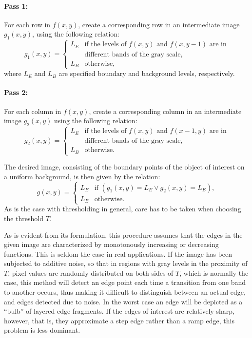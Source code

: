 \paragraph{Pass 1:} For each row in $f(x,y)$, create a corresponding
row in an intermediate image $g_{1}(x,y)$, using the following
relation: 
\begin{equation}
  g_{1}(x,y)=\left\{
    \begin{array}{ll}
      L_{E} & \mbox{if the levels of $f(x,y)$ and $f(x,y-1)$ are in} \\
            & \mbox{different bands of the gray scale,} \\
      L_{B} & \mbox{otherwise,}
    \end{array}\right.
\end{equation}
where $L_{E}$ and $L_{B}$ are specified boundary and background
levels, respectively.

\paragraph{Pass 2:} For each column in $f(x,y)$, create a
corresponding column in an intermediate image $g_{2}(x,y)$ using the
following relation:
\begin{equation}
  g_{2}(x,y)=\left\{
    \begin{array}{ll}
      L_{E} & \mbox{if the levels of $f(x,y)$ and $f(x-1,y)$ are in} \\
            & \mbox{different bands of the gray scale,} \\
      L_{B} & \mbox{otherwise.}
    \end{array}\right.
\end{equation}
\vspace*{0.1cm}

\noindent The desired image, consisting of the boundary points of the
object of interest on a uniform background, is then given by the
relation:
\begin{equation}
  g(x,y)=\left\{
    \begin{array}{ll}
      L_{E} & \mbox{if $(g_{1}(x,y)=L_{E}\vee g_{2}(x,y)=L_{E})$,} \\
      L_{B} & \mbox{otherwise.}
    \end{array}\right.
\end{equation}
As is the case with thresholding in general, care has to be taken when
choosing the threshold $T$.  

As is evident from its formulation, this procedure assumes that the
edges in the given image are characterized by monotonously increasing
or decreasing functions.  This is seldom the case in real
applications.  If the image has been subjected to additive noise, so
that in regions with gray levels in the proximity of $T$, pixel values
are randomly distributed on both sides of $T$, which is normally the
case, this method will detect an edge point each time a transition
from one band to another occurs, thus making it difficult to
distinguish between an actual edge, and edges detected due to noise.
In the worst case an edge will be depicted as a ``bulb'' of layered
edge fragments.  If the edges of interest are relatively sharp,
however, that is, they approximate a step edge rather than a ramp
edge, this problem is less dominant.

